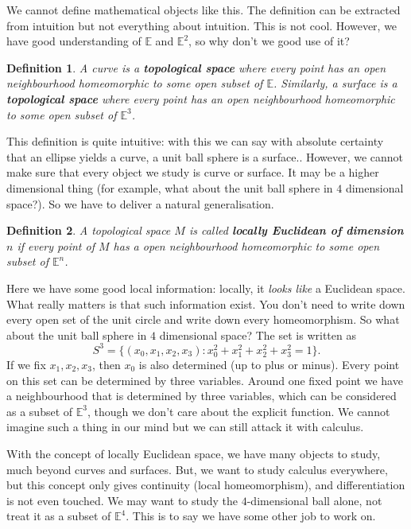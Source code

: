 \documentclass[twoside]{article}
\newtheorem{definition}{Definition}
\begin{document}
		We cannot define mathematical objects like this. The definition can be extracted from intuition but not everything about intuition. This is not cool. However, we have good understanding of $\mathbb{E}$ and $\mathbb{E}^2$, so why don't we good use of it?
		\begin{definition}	
			A curve is a \textbf{topological space} where every point has an open neighbourhood homeomorphic to some open subset of $\mathbb{E}$. Similarly, a surface is a \textbf{topological space} where every point has an open neighbourhood homeomorphic to some open subset of $\mathbb{E}^3$.
		\end{definition}
		This definition is quite intuitive: with this we can say with absolute certainty that an ellipse yields a curve, a unit ball sphere is a surface.. However, we cannot make sure that every object we study is curve or surface. It may be a higher dimensional thing (for example, what about the unit ball sphere in $4$ dimensional space?). So we have to deliver a natural generalisation. 
		\begin{definition}
			A topological space $M$ is called \textbf{locally Euclidean of dimension $n$} if every point of $M$ has a open neighbourhood homeomorphic to some open subset of $\mathbb{E}^n$.
		\end{definition}
		Here we have some good local information: locally, it \textit{looks like} a Euclidean space. What really matters is that such information exist. You don't need to write down every open set of the unit circle and write down every homeomorphism. So what about the unit ball sphere in $4$ dimensional space? The set is written as
		\[
			S^3 = \{(x_0,x_1,x_2,x_3):x_0^2+x_1^2+x_2^2+x_3^2=1\}.
		\]
		If we fix $x_1,x_2,x_3$, then $x_0$ is also determined (up to plus or minus). Every point on this set can be determined by three variables. Around one fixed point we have a neighbourhood that is determined by three variables, which can be considered as a subset of $\mathbb{E}^3$, though we don't care about the explicit function. We cannot imagine such a thing in our mind but we can still attack it with calculus.
		
		With the concept of locally Euclidean space, we have many objects to study, much beyond curves and surfaces. But, we want to study calculus everywhere, but this concept only gives continuity (local homeomorphism), and differentiation is not even touched. We may want to study the $4$-dimensional ball alone, not treat it as a subset of $\mathbb{E}^4$. This is to say we have some other job to work on.
		
\end{document}
